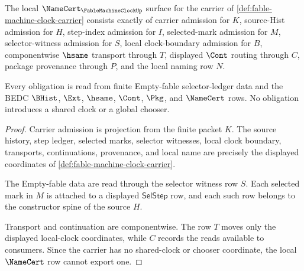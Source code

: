 \begin{theorem}
\label{thm:fable-machine-clock-namecert-obligations}
The local $\NameCert_{\FableMachineClockUp}$ surface for the carrier of \autoref{def:fable-machine-clock-carrier} consists exactly of carrier admission for $K$, source-Hist admission for $H$, step-index admission for $I$, selected-mark admission for $M$, selector-witness admission for $S$, local clock-boundary admission for $B$, componentwise $\hsame$ transport through $T$, displayed $\Cont$ routing through $C$, package provenance through $P$, and the local naming row $N$.

Every obligation is read from finite Empty-fable selector-ledger data and the BEDC $\BHist$, $\Ext$, $\hsame$, $\Cont$, $\Pkg$, and $\NameCert$ rows. No obligation introduces a shared clock or a global chooser.
\end{theorem}
\begin{proof}
Carrier admission is projection from the finite packet $K$. The source history, step ledger, selected marks, selector witnesses, local clock boundary, transports, continuations, provenance, and local name are precisely the displayed coordinates of \autoref{def:fable-machine-clock-carrier}.

The Empty-fable data are read through the selector witness row $S$. Each selected mark in $M$ is attached to a displayed $\mathsf{SelStep}$ row, and each such row belongs to the constructor spine of the source $H$.

Transport and continuation are componentwise. The row $T$ moves only the displayed local-clock coordinates, while $C$ records the reads available to consumers. Since the carrier has no shared-clock or chooser coordinate, the local $\NameCert$ row cannot export one.
\end{proof}

